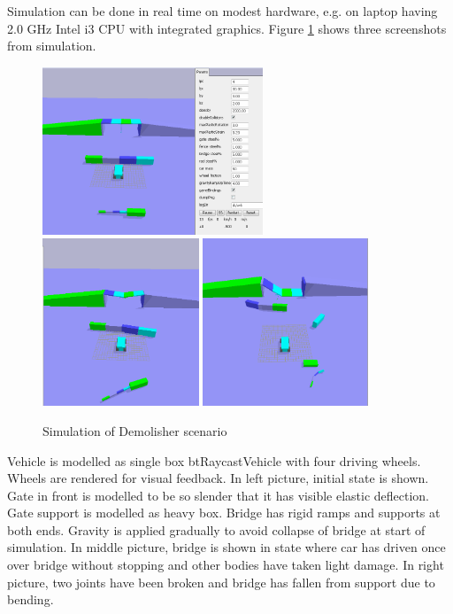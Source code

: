 Simulation can be done in real time on modest hardware, e.g. 
on laptop having 2.0 GHz Intel i3 CPU with integrated graphics. 
Figure \ref{fig:demolisher} shows three screenshots from simulation.

\begin{figure}[htb!]
\centering
\includegraphics[height=5cm]{figs/demolisher-pre}
\includegraphics[height=5cm]{figs/demolisher-wip}
\includegraphics[height=5cm]{figs/demolisher-done}
\caption{Simulation of Demolisher scenario}
\label{fig:demolisher}
\end{figure}

Vehicle is modelled as single box btRaycastVehicle with four driving wheels. Wheels are rendered for visual feedback.
In left picture, initial state is shown. Gate in front is modelled to be so slender that it has visible elastic deflection.
Gate support is modelled as heavy box.
Bridge has rigid ramps and supports at both ends.
Gravity is applied gradually to avoid collapse of bridge at start of simulation.
In middle picture,  bridge is shown in state where car has driven once over bridge without stopping and
other bodies have taken light damage.
In right picture, two joints have been broken and bridge has fallen from support due to bending.


